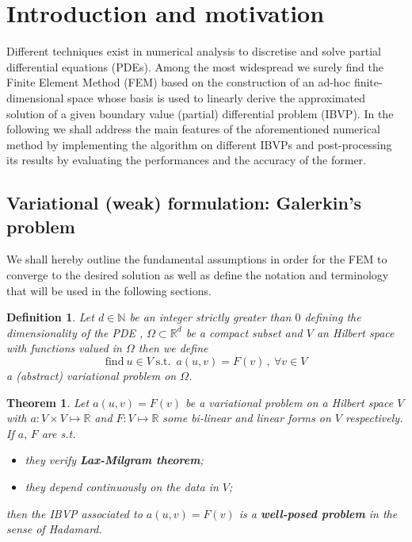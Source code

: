 \documentclass[12pt,openany,twoside,a4paper]{article}
\newtheorem{defn}{Definition}
\newtheorem{theom}{Theorem}
\begin{document}
\cleardoublepage
\section{Introduction and motivation}
Different techniques exist in numerical analysis to discretise and solve partial differential equations (PDEs). Among the most widespread we surely find the Finite Element Method (FEM) based on the construction of an ad-hoc finite-dimensional space whose basis is used to linearly derive the approximated solution of a given boundary value (partial) differential problem (IBVP).
\newline In the following we shall address the main features of the aforementioned numerical method by implementing the algorithm on different IBVPs and post-processing its results by evaluating the performances and the accuracy of the former.
\subsection{Variational (weak) formulation: Galerkin's problem}
We shall hereby outline the fundamental assumptions in order for the FEM to converge to the desired solution as well as define the notation and terminology that will be used in the following sections.

\begin{defn}\label{d1}
Let $d\in\mathbb{N}$ be an integer strictly greater than $0$ defining the dimensionality of the PDE , $\Omega\subset\mathbb{R}^d$ be a compact subset and $V$ an Hilbert space with functions valued in $\Omega$ then we define
\begin{equation*}
    \text{find} \: u\in V \;\text{s.t.}\;\: a(u,v)=F(v)\,,\:\forall v\in V
\end{equation*}
a (abstract) variational problem on $\Omega$.
\end{defn}

\begin{theom}\label{t1}
Let $a(u,v)=F(v)$ be a variational problem on a Hilbert space $V$ with $a:V\times V\mapsto\mathbb{R}$ and $F:V\mapsto\mathbb{R}$ some bi-linear and linear forms on $V$ respectively. If $a,\,F$ are s.t.
\begin{itemize}
    \item they verify \textbf{Lax-Milgram theorem};
    \item they depend continuously on the data in $V$;
\end{itemize} 
then the IBVP associated to $a(u,v)=F(v)$ is a \textbf{well-posed problem} in the sense of Hadamard.
\end{theom}
\end{document}
